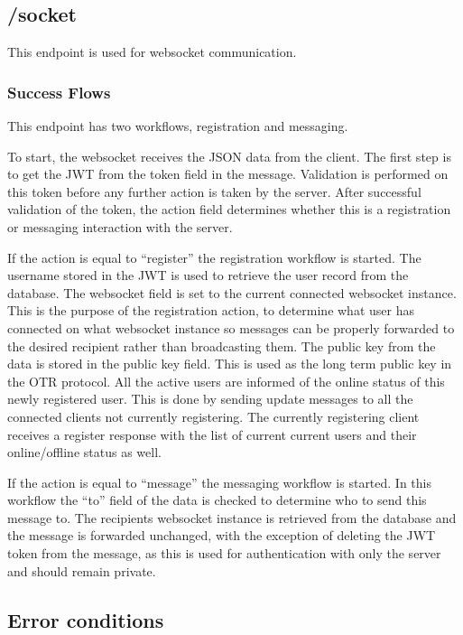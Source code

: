 \subsection{/socket}


This endpoint is used for websocket communication.


\subsubsection{Success Flows}


This endpoint has two workflows, registration and messaging.


To start, the websocket receives the JSON data from the client. The first step is to get the JWT from the token field in the message. Validation is performed on this token before any further action is taken by the server. After successful validation of the token, the action field determines whether this is a registration or messaging interaction with the server.


If the action is equal to “register” the registration workflow is started. The username stored in the JWT is used to retrieve the user record from the database. The websocket field is set to the current connected websocket instance. This is the purpose of the registration action, to determine what user has connected on what websocket instance so messages can be properly forwarded to the desired recipient rather than broadcasting them. The public key from the data is stored in the public key field. This is used as the long term public key in the OTR protocol. All the active users are informed of the online status of this newly registered user. This is done by sending update messages to all the connected clients not currently registering. The currently registering client receives a register response with the list of current current users and their online/offline status as well.


If the action is equal to “message” the messaging workflow is started. In this workflow the “to” field of the data is checked to determine who to send this message to. The recipients websocket instance is retrieved from the database and the message is forwarded unchanged, with the exception of deleting the JWT token from the message, as this is used for authentication with only the server and should remain private.


\subsection{Error conditions}


